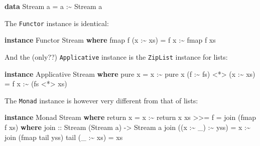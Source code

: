 \documentclass[]{article}
\newenvironment{Shaded}{}{}
\newcommand{\DataTypeTok}[1]{\textcolor[rgb]{0.56,0.13,0.00}{#1}}
\newcommand{\FunctionTok}[1]{\textcolor[rgb]{0.02,0.16,0.49}{#1}}
\newcommand{\KeywordTok}[1]{\textcolor[rgb]{0.00,0.44,0.13}{\textbf{#1}}}
\newcommand{\NormalTok}[1]{#1}
\newcommand{\OperatorTok}[1]{\textcolor[rgb]{0.40,0.40,0.40}{#1}}
\newcommand{\OtherTok}[1]{\textcolor[rgb]{0.00,0.44,0.13}{#1}}
\begin{document}
\begin{Shaded}
\begin{Highlighting}[]
\KeywordTok{data} \DataTypeTok{Stream}\NormalTok{ a }\OtherTok{=}\NormalTok{ a }\OperatorTok{:\textasciitilde{}} \DataTypeTok{Stream}\NormalTok{ a}
\end{Highlighting}
\end{Shaded}

The \texttt{Functor} instance is identical:

\begin{Shaded}
\begin{Highlighting}[]
\KeywordTok{instance} \DataTypeTok{Functor} \DataTypeTok{Stream} \KeywordTok{where}
    \FunctionTok{fmap}\NormalTok{ f (x }\OperatorTok{:\textasciitilde{}}\NormalTok{ xs) }\OtherTok{=}\NormalTok{ f x }\OperatorTok{:\textasciitilde{}} \FunctionTok{fmap}\NormalTok{ f xs}
\end{Highlighting}
\end{Shaded}

And the (only??) \texttt{Applicative} instance is the \texttt{ZipList} instance
for lists:

\begin{Shaded}
\begin{Highlighting}[]
\KeywordTok{instance} \DataTypeTok{Applicative} \DataTypeTok{Stream} \KeywordTok{where}
    \FunctionTok{pure}\NormalTok{ x }\OtherTok{=}\NormalTok{ x }\OperatorTok{:\textasciitilde{}} \FunctionTok{pure}\NormalTok{ x}
\NormalTok{    (f }\OperatorTok{:\textasciitilde{}}\NormalTok{ fs) }\OperatorTok{\textless{}*\textgreater{}}\NormalTok{ (x }\OperatorTok{:\textasciitilde{}}\NormalTok{ xs) }\OtherTok{=}\NormalTok{ f x }\OperatorTok{:\textasciitilde{}}\NormalTok{ (fs }\OperatorTok{\textless{}*\textgreater{}}\NormalTok{ xs)}
\end{Highlighting}
\end{Shaded}

The \texttt{Monad} instance is however very different from that of lists:

\begin{Shaded}
\begin{Highlighting}[]
\KeywordTok{instance} \DataTypeTok{Monad} \DataTypeTok{Stream} \KeywordTok{where}
    \FunctionTok{return}\NormalTok{ x }\OtherTok{=}\NormalTok{ x }\OperatorTok{:\textasciitilde{}} \FunctionTok{return}\NormalTok{ x}
\NormalTok{    xs }\OperatorTok{\textgreater{}\textgreater{}=}\NormalTok{ f }\OtherTok{=}\NormalTok{ join\textquotesingle{} (}\FunctionTok{fmap}\NormalTok{ f xs)}
      \KeywordTok{where}
\OtherTok{        join\textquotesingle{} ::} \DataTypeTok{Stream}\NormalTok{ (}\DataTypeTok{Stream}\NormalTok{ a) }\OtherTok{{-}\textgreater{}} \DataTypeTok{Stream}\NormalTok{ a}
\NormalTok{        join\textquotesingle{} ((x }\OperatorTok{:\textasciitilde{}}\NormalTok{ \_) }\OperatorTok{:\textasciitilde{}}\NormalTok{ yss) }\OtherTok{=}\NormalTok{ x }\OperatorTok{:\textasciitilde{}}\NormalTok{ join\textquotesingle{} (}\FunctionTok{fmap}\NormalTok{ tail\textquotesingle{} yss)}
\NormalTok{        tail\textquotesingle{} (\_ }\OperatorTok{:\textasciitilde{}}\NormalTok{ xs) }\OtherTok{=}\NormalTok{ xs}
\end{Highlighting}
\end{Shaded}
\end{document}
